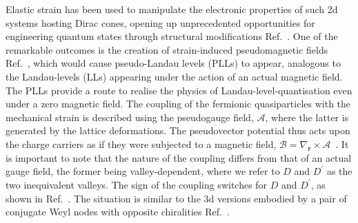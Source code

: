 \documentclass[aps,prb, onecolumn, nofootinbib, citeautoscript,10pt]{revtex4-2}
\begin{document}
Elastic strain has been used to manipulate the electronic properties of such 2d systems hosting Dirac cones, opening up unprecedented opportunities for engineering quantum states through structural modifications Ref.~\cite{neto-strain-graphene, strain-2d, graphene-strain-review, graphene-strain-geim, graphene-strain-terms, graphene-pseudo0, graphene-pseudo}. One of the remarkable outcomes is the creation of strain-induced pseudomagnetic fields Ref.~\cite{graphene-pseudo0, graphene-pseudo, strained-dirac-franz, complex-LL-strained-graphene}, which would cause pseudo-Landau levels (PLLs) to appear, analogous to the Landau-levels (LLs) appearing under the action of an actual magnetic field. The PLLs provide a route to realise the physics of Landau-level-quantisation even under a zero magnetic field. The coupling of the fermionic quasiparticles with the mechanical strain is described using the pseudogauge field, $\boldsymbol{\mathcal A}$, where the latter is generated by the lattice deformations. The pseudovector potential thus acts upon the charge carriers as if they were subjected to a magnetic field, $\boldsymbol{\mathcal B} = \nabla_{\boldsymbol r} \times \boldsymbol{\mathcal A}$~\cite{pikulin16_chiral, ips_rahul_ph_strain, azaz-disorder, ips-ruiz, ips-rsw-ph, ips-nlsm-strain}. It is important to note that the nature of the coupling differs from that of an actual gauge field, the former being valley-dependent, where we refer to $D$ and $D^\prime $ as the two inequivalent valleys. The sign of the coupling switches for $D$ and $D^\prime $, as shown in Ref.~\cite{strained-dirac-franz}. The situation is similar to the 3d versions embodied by a pair of conjugate Weyl nodes with opposite chiralities Ref.~\cite{pikulin16_chiral}.
\end{document}
